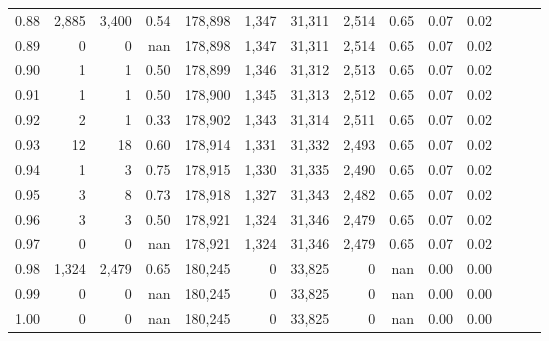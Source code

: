 \begin{tabular}{rrrrrrrrrrrrrr}
0.88 &   2,885 &  3,400 &  0.54 &  178,898 &    1,347 &  31,311 &   2,514 &  0.65 &  0.07 &      0.02 \\
0.89 &       0 &      0 &   nan &  178,898 &    1,347 &  31,311 &   2,514 &  0.65 &  0.07 &      0.02 \\
0.90 &       1 &      1 &  0.50 &  178,899 &    1,346 &  31,312 &   2,513 &  0.65 &  0.07 &      0.02 \\
0.91 &       1 &      1 &  0.50 &  178,900 &    1,345 &  31,313 &   2,512 &  0.65 &  0.07 &      0.02 \\
0.92 &       2 &      1 &  0.33 &  178,902 &    1,343 &  31,314 &   2,511 &  0.65 &  0.07 &      0.02 \\
0.93 &      12 &     18 &  0.60 &  178,914 &    1,331 &  31,332 &   2,493 &  0.65 &  0.07 &      0.02 \\
0.94 &       1 &      3 &  0.75 &  178,915 &    1,330 &  31,335 &   2,490 &  0.65 &  0.07 &      0.02 \\
0.95 &       3 &      8 &  0.73 &  178,918 &    1,327 &  31,343 &   2,482 &  0.65 &  0.07 &      0.02 \\
0.96 &       3 &      3 &  0.50 &  178,921 &    1,324 &  31,346 &   2,479 &  0.65 &  0.07 &      0.02 \\
0.97 &       0 &      0 &   nan &  178,921 &    1,324 &  31,346 &   2,479 &  0.65 &  0.07 &      0.02 \\
0.98 &   1,324 &  2,479 &  0.65 &  180,245 &        0 &  33,825 &       0 &   nan &  0.00 &      0.00 \\
0.99 &       0 &      0 &   nan &  180,245 &        0 &  33,825 &       0 &   nan &  0.00 &      0.00 \\
1.00 &       0 &      0 &   nan &  180,245 &        0 &  33,825 &       0 &   nan &  0.00 &      0.00 \\
\bottomrule
\end{tabular}
